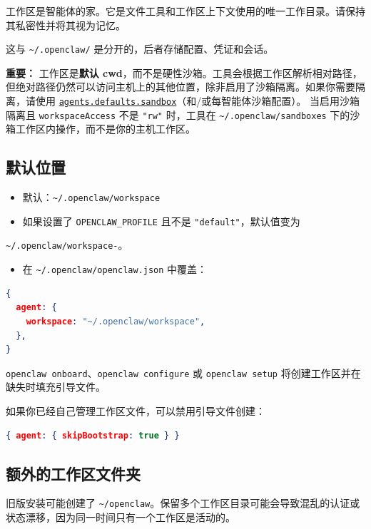 工作区是智能体的家。它是文件工具和工作区上下文使用的唯一工作目录。请保持其私密性并将其视为记忆。

这与 \texttt{\textasciitilde{}/.openclaw/} 是分开的，后者存储配置、凭证和会话。

\textbf{重要：} 工作区是\textbf{默认 cwd}，而不是硬性沙箱。工具会根据工作区解析相对路径，但绝对路径仍然可以访问主机上的其他位置，除非启用了沙箱隔离。如果你需要隔离，请使用
\href{/gateway/sandboxing}{\texttt{agents.defaults.sandbox}}（和/或每智能体沙箱配置）。
当启用沙箱隔离且 \texttt{workspaceAccess} 不是 \texttt{"rw"} 时，工具在 \texttt{\textasciitilde{}/.openclaw/sandboxes} 下的沙箱工作区内操作，而不是你的主机工作区。

\subsection{默认位置}


\begin{itemize}
  \item 默认：\texttt{\textasciitilde{}/.openclaw/workspace}
  \item 如果设置了 \texttt{OPENCLAW\_PROFILE} 且不是 \texttt{"default"}，默认值变为
\end{itemize}

\texttt{\textasciitilde{}/.openclaw/workspace-}。
\begin{itemize}
  \item 在 \texttt{\textasciitilde{}/.openclaw/openclaw.json} 中覆盖：
\end{itemize}


\begin{lstlisting}[language=json]
{
  agent: {
    workspace: "~/.openclaw/workspace",
  },
}
\end{lstlisting}


\texttt{openclaw onboard}、\texttt{openclaw configure} 或 \texttt{openclaw setup} 将创建工作区并在缺失时填充引导文件。

如果你已经自己管理工作区文件，可以禁用引导文件创建：

\begin{lstlisting}[language=json]
{ agent: { skipBootstrap: true } }
\end{lstlisting}


\subsection{额外的工作区文件夹}


旧版安装可能创建了 \texttt{\textasciitilde{}/openclaw}。保留多个工作区目录可能会导致混乱的认证或状态漂移，因为同一时间只有一个工作区是活动的。

